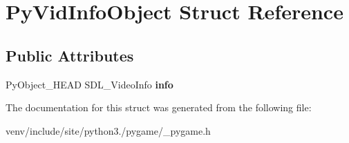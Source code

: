 \hypertarget{struct_py_vid_info_object}{}\section{Py\+Vid\+Info\+Object Struct Reference}
\label{struct_py_vid_info_object}
\subsection*{Public Attributes}
\begin{DoxyCompactItemize}
\item 
\mbox{\label{struct_py_vid_info_object_a30c0036569e4b021a671caf61aaf059f}} 
Py\+Object\+\_\+\+H\+E\+AD S\+D\+L\+\_\+\+Video\+Info {\bfseries info}
\end{DoxyCompactItemize}


The documentation for this struct was generated from the following file\+:\begin{DoxyCompactItemize}
\item 
venv/include/site/python3./pygame/\+\_\+pygame.\+h\end{DoxyCompactItemize}
